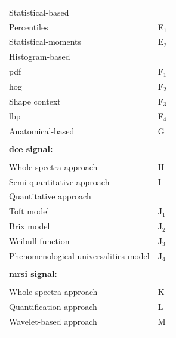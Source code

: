 \begin{table}
\begin{tabular}{p{.7\linewidth} >{\centering\arraybackslash}p{.20\linewidth}}
		\quad \quad Statistical-based & \\
		\quad \quad \quad Percentiles & E$_1$ \\
		\quad \quad \quad Statistical-moments & E$_2$ \\
		\quad \quad Histogram-based & \\
		\quad \quad \quad \Ac{pdf} & F$_1$ \\
		\quad \quad \quad \Ac{hog} & F$_2$ \\
		\quad \quad \quad Shape context & F$_3$ \\
		\quad \quad \quad \Ac{lbp} & F$_4$ \\
		\quad \quad Anatomical-based & G \\ \\ [-1.5ex]
		\textbf{\ac{dce} signal:} & \\ \\ [-1.5ex]
		\quad Whole spectra approach & H \\
		\quad Semi-quantitative approach & I \\
		\quad Quantitative approach &  \\
		\quad \quad Toft model & J$_1$ \\
		\quad \quad Brix model & J$_2$ \\
		\quad \quad Weibull function & J$_3$ \\
		\quad \quad Phenomenological universalities model & J$_4$ \\
		\\ [-1.5ex]
		\textbf{\ac{mrsi} signal:} & \\ \\ [-1.5ex]
		\quad Whole spectra approach & K \\
		\quad Quantification approach & L \\
		\quad Wavelet-based approach & M \\ \\ [-1.5ex]
		\hline
	\end{tabular}
	\label{tab:feat}
\end{table}


